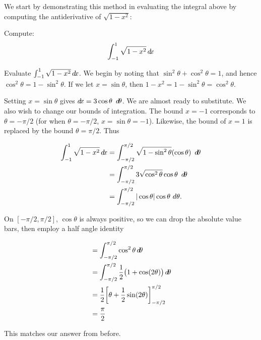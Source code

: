 \documentclass{ximera}
\begin{document}
\begin{image}
\end{image} 

\begin{image}
\end{image}

We start by demonstrating this method in evaluating the integral
above by computing the antiderivative of $\sqrt{1-x^2}$:

\begin{example}
  Compute:
  \[
  \int_{-1}^1 \sqrt{1-x^2} \mathop{}\!d\! x
  \]
  \begin{explanation}
  
  Evaluate $\int_{-1}^1\sqrt{1-x^2}\mathop{}\!d\! x$. We begin by noting that
    $\sin^2\theta + \cos^2\theta = 1$, and hence $\cos^2\theta =
    1-\sin^2\theta$. If we let $x=\sin\theta$, then $1-x^2 =
    1-\sin^2\theta = \cos^2\theta$.

Setting $x=\sin \theta$ gives $\mathop{}\!d\! x = 3\cos\theta\ \mathop{}\!d\! \theta$. We are
almost ready to substitute. We also wish to change our bounds of
integration. The bound $x=-1$ corresponds to $\theta = -\pi/2$ (for
when $\theta = -\pi/2$, $x=\sin \theta = -1$). Likewise, the bound of
$x=1$ is replaced by the bound $\theta = \pi/2$. Thus

\begin{align*}
  \int_{-1}^1\sqrt{1-x^2} \mathop{}\!d\! x &= \int_{-\pi/2}^{\pi/2} \sqrt{1-\sin^2\theta} (\cos\theta)\ \mathop{}\!d\! \theta \\
  &= \int_{-\pi/2}^{\pi/2} 3\sqrt{\cos^2\theta} \cos\theta\ \mathop{}\!d\! \theta \\
  &=\int_{-\pi/2}^{\pi/2} |\cos \theta| \cos\theta\ d\theta.
\end{align*}

On $[-\pi/2,\pi/2]$, $\cos \theta$ is always positive, so we can drop the absolute value bars, then employ a half angle identity

    \begin{align*}
      &= \int_{-\pi/2}^{\pi/2} \cos^2 \theta \mathop{}\!d\! \theta \\
      &= \int_{-\pi/2}^{\pi/2} \frac{1}{2}\big(1+\cos(2\theta)\big) \mathop{}\!d\! \theta\\
      &= \frac{1}{2} \bigg[ \theta +\frac{1}{2}\sin(2\theta) \bigg]_{-\pi/2}^{\pi/2}\\
      &=\frac{\pi}{2}
    \end{align*}
    
    This matches our answer from before.
  \end{explanation}
\end{example}
\end{document}
